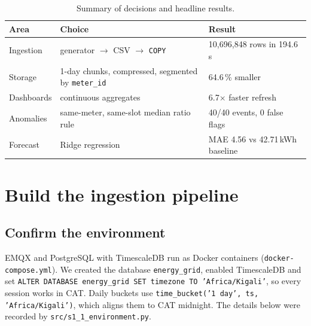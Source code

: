 \documentclass[11pt,a4paper]{article}
\begin{document}
\begin{table}[H]\centering\small
\begin{tabular}{lll}\toprule
Area & Choice & Result\\\midrule
Ingestion & generator $\rightarrow$ CSV $\rightarrow$ \texttt{COPY} & 10,696,848 rows in 194.6\,s\\
Storage & 1-day chunks, compressed, segmented by \texttt{meter\_id} & 64.6\,\% smaller\\
Dashboards & continuous aggregates & 6.7$\times$ faster refresh\\
Anomalies & same-meter, same-slot median ratio rule & 40/40 events, 0 false flags\\
Forecast & Ridge regression & MAE 4.56 vs 42.71\,kWh baseline\\\bottomrule
\end{tabular}
\caption{Summary of decisions and headline results.}
\end{table}

\section{Build the ingestion pipeline}

\subsection{Confirm the environment}
EMQX and PostgreSQL with TimescaleDB run as Docker containers
(\texttt{docker-compose.yml}). We created the database \texttt{energy\_grid},
enabled TimescaleDB and set
\texttt{ALTER DATABASE energy\_grid SET timezone TO 'Africa/Kigali'}, so every
session works in CAT. Daily buckets use
\texttt{time\_bucket('1 day', ts, 'Africa/Kigali')}, which aligns them to CAT
midnight. The details below were recorded by \texttt{src/s1\_1\_environment.py}.
\end{document}
